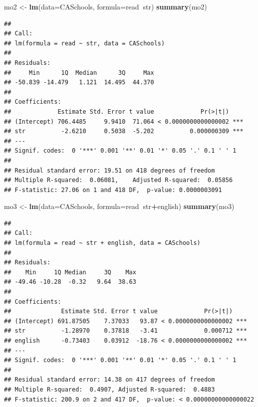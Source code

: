 \documentclass[
]{book}
\newenvironment{Shaded}{\begin{snugshade}}{\end{snugshade}}
\newcommand{\DataTypeTok}[1]{\textcolor[rgb]{0.13,0.29,0.53}{#1}}
\newcommand{\KeywordTok}[1]{\textcolor[rgb]{0.13,0.29,0.53}{\textbf{#1}}}
\newcommand{\NormalTok}[1]{#1}
\newcommand{\OperatorTok}[1]{\textcolor[rgb]{0.81,0.36,0.00}{\textbf{#1}}}
\newcommand{\StringTok}[1]{\textcolor[rgb]{0.31,0.60,0.02}{#1}}
\begin{document}
\begin{Shaded}
\begin{Highlighting}[]
\NormalTok{mo2 <-}\StringTok{ }\KeywordTok{lm}\NormalTok{(}\DataTypeTok{data=}\NormalTok{CASchools, }\DataTypeTok{formula=}\NormalTok{read}\OperatorTok{~}\NormalTok{str)}
\KeywordTok{summary}\NormalTok{(mo2)}
\end{Highlighting}
\end{Shaded}

\begin{verbatim}
## 
## Call:
## lm(formula = read ~ str, data = CASchools)
## 
## Residuals:
##     Min      1Q  Median      3Q     Max 
## -50.839 -14.479   1.121  14.495  44.370 
## 
## Coefficients:
##             Estimate Std. Error t value             Pr(>|t|)    
## (Intercept) 706.4485     9.9410  71.064 < 0.0000000000000002 ***
## str          -2.6210     0.5038  -5.202          0.000000309 ***
## ---
## Signif. codes:  0 '***' 0.001 '**' 0.01 '*' 0.05 '.' 0.1 ' ' 1
## 
## Residual standard error: 19.51 on 418 degrees of freedom
## Multiple R-squared:  0.06081,    Adjusted R-squared:  0.05856 
## F-statistic: 27.06 on 1 and 418 DF,  p-value: 0.0000003091
\end{verbatim}

\begin{Shaded}
\begin{Highlighting}[]
\NormalTok{mo3 <-}\StringTok{ }\KeywordTok{lm}\NormalTok{(}\DataTypeTok{data=}\NormalTok{CASchools, }\DataTypeTok{formula=}\NormalTok{read}\OperatorTok{~}\NormalTok{str}\OperatorTok{+}\NormalTok{english)}
\KeywordTok{summary}\NormalTok{(mo3)}
\end{Highlighting}
\end{Shaded}

\begin{verbatim}
## 
## Call:
## lm(formula = read ~ str + english, data = CASchools)
## 
## Residuals:
##    Min     1Q Median     3Q    Max 
## -49.46 -10.28  -0.32   9.64  38.63 
## 
## Coefficients:
##              Estimate Std. Error t value             Pr(>|t|)    
## (Intercept) 691.87505    7.37033   93.87 < 0.0000000000000002 ***
## str          -1.28970    0.37818   -3.41             0.000712 ***
## english      -0.73403    0.03912  -18.76 < 0.0000000000000002 ***
## ---
## Signif. codes:  0 '***' 0.001 '**' 0.01 '*' 0.05 '.' 0.1 ' ' 1
## 
## Residual standard error: 14.38 on 417 degrees of freedom
## Multiple R-squared:  0.4907, Adjusted R-squared:  0.4883 
## F-statistic: 200.9 on 2 and 417 DF,  p-value: < 0.00000000000000022
\end{verbatim}
\end{document}
